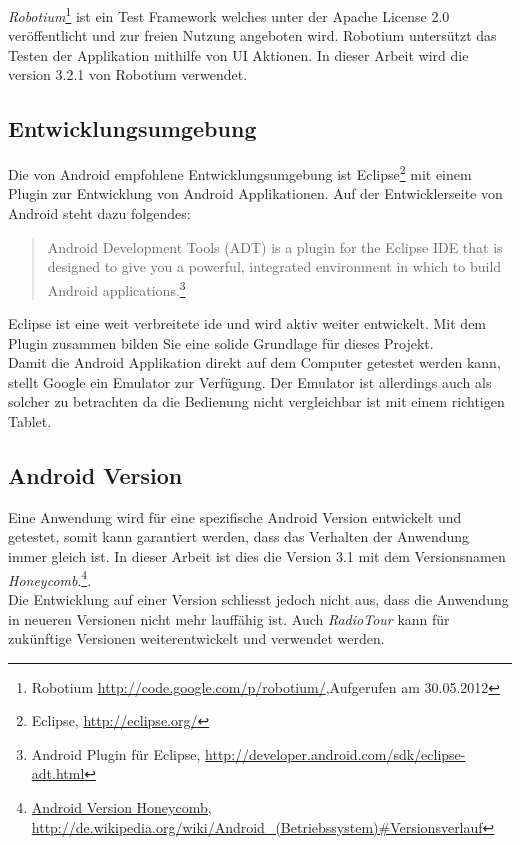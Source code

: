 \textit{Robotium}\footnote{Robotium \url{http://code.google.com/p/robotium/},Aufgerufen am 30.05.2012} ist ein Test Framework welches unter der Apache License 2.0 veröffentlicht und zur freien Nutzung angeboten wird. Robotium untersützt das Testen der Applikation mithilfe von UI Aktionen. In dieser Arbeit wird die version 3.2.1 von Robotium verwendet.  


\subsection{Entwicklungsumgebung}
Die von Android empfohlene Entwicklungsumgebung ist Eclipse\footnote{Eclipse, \url{http://eclipse.org/}} mit einem Plugin zur Entwicklung von Android Applikationen. Auf der Entwicklerseite von Android steht dazu folgendes:
\begin{quote}
Android Development Tools (ADT) is a plugin for the Eclipse IDE that is designed to give you a powerful, integrated environment in which to build Android applications.\footnote{Android Plugin für Eclipse, \url{http://developer.android.com/sdk/eclipse-adt.html}}
\end{quote}
Eclipse ist eine weit verbreitete \gls{ide} und wird aktiv weiter entwickelt. Mit dem Plugin zusammen bilden Sie eine solide Grundlage für dieses Projekt.
\\
Damit die Android Applikation direkt auf dem Computer getestet werden kann, stellt Google ein Emulator zur Verfügung. Der Emulator ist allerdings auch als solcher zu betrachten da die Bedienung nicht vergleichbar ist mit einem richtigen Tablet.

\subsection{Android Version}
Eine Anwendung wird für eine spezifische Android Version entwickelt und getestet, somit kann garantiert werden, dass das Verhalten der Anwendung  immer gleich ist. In dieser Arbeit ist dies die Version 3.1 mit dem Versionsnamen \textit{Honeycomb}.\footnote{\url{Android Version Honeycomb, http://de.wikipedia.org/wiki/Android_(Betriebssystem)\#Versionsverlauf}}.
\\
Die Entwicklung auf einer Version schliesst jedoch nicht aus, dass die Anwendung in neueren Versionen nicht mehr lauffähig ist. Auch \textit{RadioTour} kann für zukünftige Versionen weiterentwickelt und verwendet werden.

